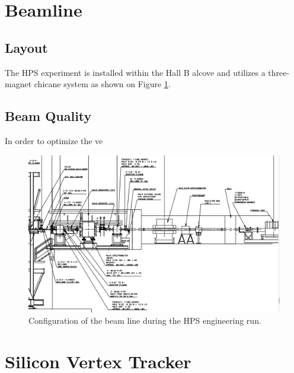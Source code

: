 \section{Beamline}

\subsection{Layout}

The HPS experiment is installed within the Hall B alcove and utilizes a 
three-magnet chicane system as shown on Figure \ref{fig:beamline}. 

\subsection{Beam Quality}

In order to optimize the ve






\begin{figure}
    \centering
    \includegraphics[width=\textwidth]{images/beamline.png}
    \caption{Configuration of the beam line during the HPS engineering run.}
    \label{fig:beamline}
\end{figure}

\section{Silicon Vertex Tracker}


